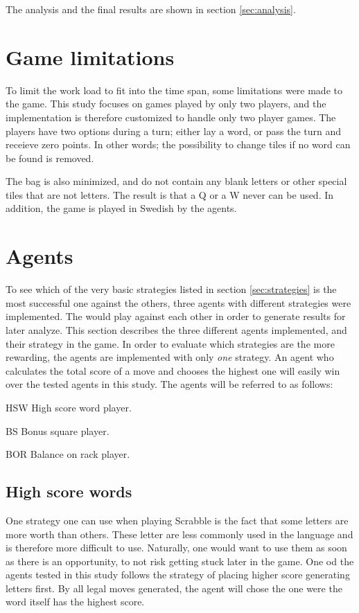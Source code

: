 \documentclass[a4paper, 12pt]{report}
\begin{document}
The analysis and the final results are shown in section \ref{sec:analysis}.

\section{Game limitations}
\label{sec:limitations}
To limit the work load to fit into the time span, some limitations were made to the game. This study focuses on games played by only two players, and the implementation is therefore customized to handle only two player games. The players have two options during a turn; either lay a word, or pass the turn and receieve zero points. In other words; the possibility to change tiles if no word can be found is removed. 

The bag is also minimized, and do not contain any blank letters or other special tiles that are not letters. The result is that a Q or a W never can be used. In addition, the game is played in Swedish by the agents.

\section{Agents}
\label{sec:agents}
To see which of the very basic strategies listed in section \ref{sec:strategies} is the most successful one against the others, three agents with different strategies were implemented. The would play against each other in order to generate results for later analyze. This section describes the three different agents implemented, and their strategy in the game. In order to evaluate which strategies are the more rewarding, the agents are implemented with only \emph{one} strategy. An agent who calculates the total score of a move and chooses the highest one will easily win over the tested agents in this study. The agents will be referred to as follows:
\begin{description}
\item{HSW} High score word player.
\item{BS} Bonus square player.
\item{BOR} Balance on rack player.
\end{description}

\subsection{High score words}
One strategy one can use when playing Scrabble is the fact that some letters are more worth than others. These letter are less commonly used in the language and is therefore more difficult to use. Naturally, one would want to use them as soon as there is an opportunity, to not risk getting stuck later in the game. One od the agents tested in this study follows the strategy of placing higher score generating letters first. By all legal moves generated, the agent will chose the one were the word itself has the highest score. 
\end{document}
